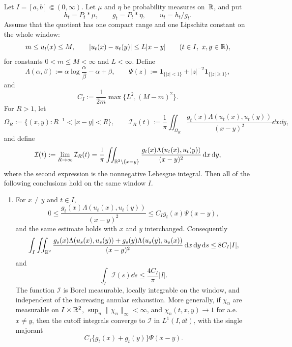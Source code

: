 \begin{proposition}[Bounded Lipschitz quotient implies \(H'=-I\)]%
\label{prop:compact-window-bregman-identity}
Let \(I=[a,b]\Subset(0,\infty)\).  Let \(\mu\) and \(\eta\) be probability
measures on~\(\mathbb{R}\), and put
\[
h_t=P_t*\mu,\qquad g_t=P_t*\eta,\qquad u_t=h_t/g_t .
\]
Assume that the quotient has one compact range and one Lipschitz constant on
the whole window:
\begin{equation}\label{eq:abstract-bounded-lipschitz-quotient-hypothesis}
m\le u_t(x)\le M,\qquad |u_t(x)-u_t(y)|\le L|x-y|
\qquad(t\in I,\ x,y\in\mathbb{R}),
\end{equation}
for constants \(0<m\le M<\infty\) and \(L<\infty\).  Define
\[
\Lambda(\alpha,\beta):=\alpha\log\frac{\alpha}{\beta}-\alpha+\beta,
\qquad
\Psi(z):=\mathbf1_{\{|z|<1\}}+|z|^{-2}\mathbf1_{\{|z|\ge1\}},
\]
and
\[
C_I:=\frac{1}{2m}\max\{L^2,(M-m)^2\}.
\]
For \(R>1\), let
\[
\Omega_R:=\{(x,y):R^{-1}<|x-y|<R\},
\qquad
\mathscr I_R(t):=\frac1\pi\iint_{\Omega_R}
\frac{g_t(x)\Lambda(u_t(x),u_t(y))}{(x-y)^2}\dd x\dd y ,
\]
and define
\begin{equation}\label{eq:abstract-bounded-lipschitz-full-dissipation}
\mathcal{I}(t):=\lim_{R\to\infty}\mathcal{I}_R(t)
=\frac1\pi\iint_{\mathbb{R}^2\setminus\{x=y\}}
\frac{g_t(x)\Lambda(u_t(x),u_t(y))}{(x-y)^2}\,\mathrm{d} x\,\mathrm{d} y,
\end{equation}
where the second expression is the nonnegative Lebesgue integral.  Then all
of the following conclusions hold on the same window \(I\).

\begin{enumerate}
\item For \(x\ne y\) and \(t\in I\),
\begin{equation}\label{eq:abstract-bounded-lipschitz-majorant}
0\le
\frac{g_t(x)\Lambda(u_t(x),u_t(y))}{(x-y)^2}
\le C_I g_t(x)\Psi(x-y),
\end{equation}
and the same estimate holds with \(x\) and \(y\) interchanged.  Consequently
\begin{equation}\label{eq:abstract-bounded-lipschitz-sym-integral-bound}
\int_I\iint_{\mathbb{R}^2}
\frac{
g_s(x)\Lambda(u_s(x),u_s(y))
+g_s(y)\Lambda(u_s(y),u_s(x))}
{(x-y)^2}\,\mathrm{d} x\,\mathrm{d} y\,\mathrm{d} s
\le 8C_I|I|,
\end{equation}
and
\begin{equation}\label{eq:abstract-bounded-lipschitz-one-sided-bound}
\int_I \mathscr I(s)\dd s\le \frac{4C_I}{\pi}|I|.
\end{equation}
The function \(\mathscr I\) is Borel measurable, locally integrable on the
window, and independent of the increasing annular exhaustion.  More generally, if
\(\chi_n\) are measurable on \(I\times\mathbb{R}^2\),
\(\sup_n\|\chi_n\|_\infty<\infty\), and
\(\chi_n(t,x,y)\to1\) for a.e. \(x\ne y\), then the cutoff integrals converge
to \(\mathscr I\) in \(L^1(I,\dd t)\), with the single majorant
\[
C_I\{g_t(x)+g_t(y)\}\Psi(x-y).
\]


\end{enumerate}
\end{proposition}

